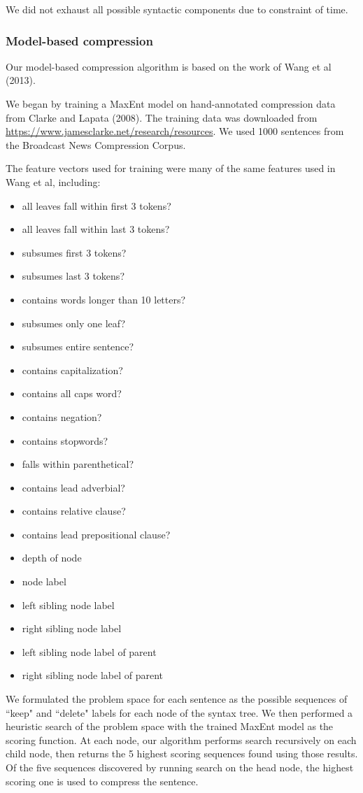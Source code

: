 \documentclass[11pt]{article}
\begin{document}
We did not exhaust all possible syntactic components due to constraint of time.

\subsubsection{Model-based compression}

Our model-based compression algorithm is based on the work of Wang et al (2013).

We began by training a MaxEnt model on hand-annotated compression data from Clarke and Lapata (2008). The training data was downloaded from \url{https://www.jamesclarke.net/research/resources}. We used 1000 sentences from the Broadcast News Compression Corpus.

The feature vectors used for training were many of the same features used in Wang et al, including:
\begin{itemize}
\item all leaves fall within first 3 tokens?
\item all leaves fall within last 3 tokens?
\item subsumes first 3 tokens?
\item subsumes last 3 tokens?
\item contains words longer than 10 letters?
\item subsumes only one leaf?
\item subsumes entire sentence?
\item contains capitalization?
\item contains all caps word?
\item contains negation?
\item contains stopwords?
\item falls within parenthetical?
\item contains lead adverbial?
\item contains relative clause?
\item contains lead prepositional clause?
\item depth of node
\item node label
\item left sibling node label
\item right sibling node label
\item left sibling node label of parent
\item right sibling node label of parent
\end{itemize}

We formulated the problem space for each sentence as the possible sequences of ``keep" and ``delete" labels for each node of the syntax tree. We then performed a heuristic search of the problem space with the trained MaxEnt model as the scoring function. At each node, our algorithm performs search recursively on each child node, then returns the 5 highest scoring sequences found using those results. Of the five sequences discovered by running search on the head node, the highest scoring one is used to compress the sentence.
\end{document}
